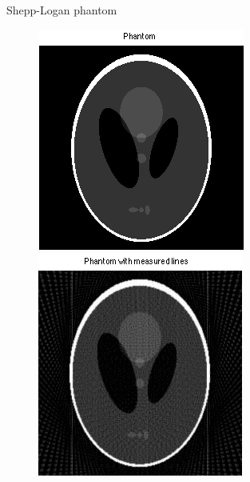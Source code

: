 \begin{frame}{Shepp-Logan phantom}
\begin{figure}[!tbp]
  \centering
  \begin{minipage}[b]{0.45\textwidth}
    \includegraphics[width=\textwidth]{Images/phantom.png}
  \end{minipage}
  \hfill
  \begin{minipage}[b]{0.45\textwidth}
    \includegraphics[width=\textwidth]{Images/phantom_measured.png}
  \end{minipage}
\end{figure}
\end{frame}

